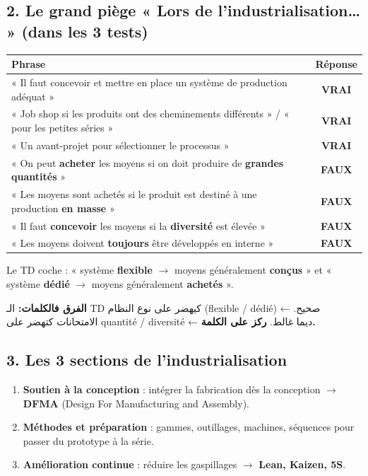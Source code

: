 \documentclass[11pt,a4paper]{article}
\newcommand{\fr}[1]{\textfrench{#1}}
\newcommand{\vrai}{\textcolor{vert}{\textbf{VRAI}}}
\newcommand{\faux}{\textcolor{rouge}{\textbf{FAUX}}}
\begin{document}
\subsection*{2. Le grand piège « Lors de l'industrialisation\ldots{} » \quad (dans les 3 tests)}
\begin{center}
\begin{tabularx}{\linewidth}{X c}
\toprule
\textbf{Phrase} & \textbf{Réponse} \\
\midrule
« Il faut concevoir et mettre en place un système de production adéquat » & \vrai \\
« Job shop si les produits ont des cheminements différents » / « pour les petites séries » & \vrai \\
« Un avant-projet pour sélectionner le processus » & \vrai \\
« On peut \textbf{acheter} les moyens si on doit produire de \textbf{grandes quantités} » & \faux \\
« Les moyens sont achetés si le produit est destiné à une production \textbf{en masse} » & \faux \\
« Il faut \textbf{concevoir} les moyens si la \textbf{diversité} est élevée » & \faux \\
« Les moyens doivent \textbf{toujours} être développés en interne » & \faux \\
\bottomrule
\end{tabularx}
\end{center}

\begin{alerte}
Le TD coche : « système \textbf{flexible} $\rightarrow$ moyens généralement \textbf{conçus} » et « système \textbf{dédié} $\rightarrow$ moyens généralement \textbf{achetés} ».
\par\begin{Arabic}
\textbf{الفرق فالكلمات:} الـ \fr{TD} كيهضر على نوع النظام (\fr{flexible / dédié}) ← صحيح. الامتحانات كتهضر على \fr{quantité / diversité} ← ديما غالط. \textbf{ركز على الكلمة.}
\end{Arabic}
\end{alerte}

\subsection*{3. Les 3 sections de l'industrialisation}
\begin{enumerate}
\item \textbf{Soutien à la conception} : intégrer la fabrication dès la conception $\rightarrow$ \textbf{DFMA} (Design For Manufacturing and Assembly).
\item \textbf{Méthodes et préparation} : gammes, outillages, machines, séquences pour passer du prototype à la série.
\item \textbf{Amélioration continue} : réduire les gaspillages $\rightarrow$ \textbf{Lean, Kaizen, 5S}.
\end{enumerate}
\end{document}
